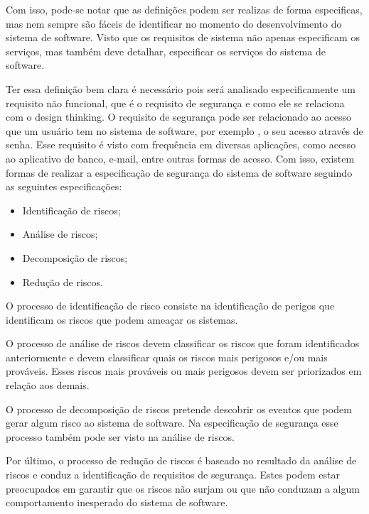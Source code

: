 \documentclass[a4paper,twoside]{article}
\begin{document}
Com isso, pode-se notar que as definições podem ser realizas de forma especificas, mas nem sempre são fáceis de identificar no momento do desenvolvimento do sistema de software. Visto que os requisitos de sistema não apenas especificam os serviços, mas também deve detalhar, especificar os serviços do sistema de software\cite{Sommerville_2011_texbook}.

Ter essa definição bem clara é necessário pois será analisado especificamente um requisito não funcional, que é o requisito de segurança e como ele se relaciona com o design thinking.
O requisito de segurança pode ser relacionado ao acesso que um usuário tem no sistema de software, por exemplo , o seu acesso através de senha. Esse requisito é visto com frequência em diversas aplicações, como acesso ao aplicativo de banco, e-mail, entre outras formas de acesso. Com isso, existem formas de realizar a especificação de segurança do sistema de software seguindo as seguintes especificações\cite{Sommerville_2011_texbook}:

\begin{itemize}
    \item Identificação de riscos;
    \item Análise de riscos;
    \item Decomposição de riscos;
    \item Redução de riscos.
\end{itemize}

O processo de  identificação de risco consiste na identificação de perigos que identificam os riscos que podem ameaçar os sistemas. 

O processo de análise de riscos devem classificar os riscos que foram identificados anteriormente e devem classificar quais os riscos mais perigosos e/ou mais prováveis. Esses riscos mais prováveis ou mais perigosos devem ser priorizados em relação aos demais.

O processo de decomposição de riscos pretende descobrir os eventos que podem gerar algum risco ao sistema de software. Na especificação de segurança esse processo também pode ser visto na análise de riscos.

Por último, o processo de redução de riscos é baseado no resultado da análise de riscos e conduz a identificação de requisitos de segurança. Estes podem estar preocupados em garantir que os riscos não surjam ou que não conduzam a algum comportamento inesperado do sistema de software.
\end{document}
